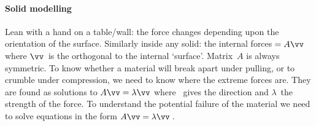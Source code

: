 \begin{comment}
Dynamics of two masses on a spring (relate to molecular vibrations), and seek solutions in~\(\cos(ft)\) for eigenvalue \(\lambda=f^2\).  
As done for three masses in Example~\ref{eg:eig3vib}.  Say symmetry from equal and opposite, claim holds even for gigantic structures with millions of interacting components.
\end{comment}


\paragraph{Solid modelling} Lean with a hand on a table\slash wall: the force changes depending upon the orientation of the surface.  
Similarly inside any solid: the internal forces\({}=A\vv\) where \(\vv\)~is the orthogonal  to the internal `surface'.  
Matrix~\(A\) is always symmetric.  
To know whether a material will break apart under pulling, or to crumble under compression,  we need to know where the extreme forces are.  
They are found as solutions to \(A\vv=\lambda\vv\) where \vv~gives the direction and \(\lambda\)~the strength of the force.
To understand the potential failure of the material we need to solve equations in the form \(A\vv=\lambda\vv\)\,.




\endinput


